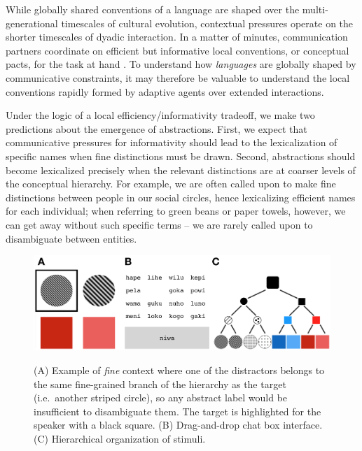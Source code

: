 \documentclass[10pt,letterpaper]{article}
\begin{document}
While globally shared conventions of a language are shaped over the multi-generational timescales of cultural evolution, contextual pressures operate on the shorter timescales of dyadic interaction. 
In a matter of minutes, communication partners coordinate on efficient but informative local conventions, or conceptual pacts, for the task at hand \cite{ClarkWilkesGibbs86_ReferringCollaborative,HawkinsFrankGoodman17_ConventionFormation}. %
To understand how \emph{languages} are globally shaped by communicative constraints, it may therefore be valuable to understand the local conventions rapidly formed by adaptive agents over extended interactions.

Under the logic of a local efficiency/informativity tradeoff, we make two predictions about the emergence of abstractions. First, we expect that communicative pressures for informativity should lead to the lexicalization of specific names when fine distinctions must be drawn. Second, abstractions should become lexicalized precisely when the relevant distinctions are at coarser levels of the conceptual hierarchy. 
For example, we are often called upon to make fine distinctions between people in our social circles, hence lexicalizing efficient names for each individual; when referring to green beans or paper towels, however, we can get away without such specific terms -- we are rarely called upon to disambiguate between entities. %

\begin{figure}[t]
\begin{center}
{\includegraphics[scale=.6]{fig.png}}
{\caption{{(A) Example of \emph{fine} context where one of the distractors belongs to the same fine-grained branch of the hierarchy as the target (i.e.\ another striped circle), so any abstract label would be insufficient to disambiguate them. The target is highlighted for the speaker with a black square. (B) Drag-and-drop chat box interface. (C) Hierarchical organization of stimuli.\label{exp}}}}
\end{center}
\end{figure}
\end{document}
